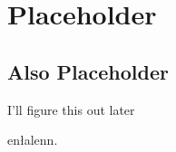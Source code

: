 
\chapter{Placeholder}

\begin{multicols*}{2}

\section{Also Placeholder}

\begin{dictroot}{I'll figure this out later}
    \begin{dictentry}{en\l alen}{n.}
    \end{dictentry}
\end{dictroot}

\end{multicols*}